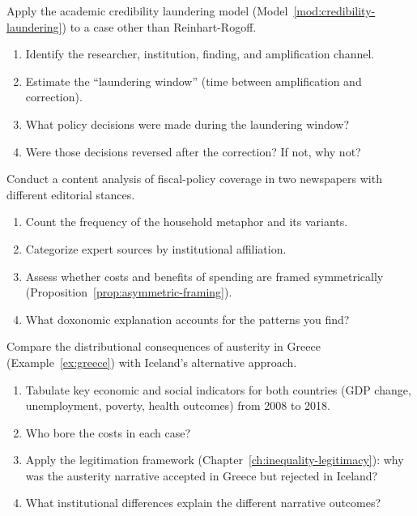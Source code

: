 \begin{exercise}
Apply the academic credibility laundering model (Model~\ref{mod:credibility-laundering}) to a case other than Reinhart-Rogoff.
\begin{enumerate}[nosep]
  \item Identify the researcher, institution, finding, and amplification channel.
  \item Estimate the ``laundering window'' (time between amplification and correction).
  \item What policy decisions were made during the laundering window?
  \item Were those decisions reversed after the correction? If not, why not?
\end{enumerate}
\end{exercise}

\begin{exercise}
Conduct a content analysis of fiscal-policy coverage in two newspapers with different editorial stances.
\begin{enumerate}[nosep]
  \item Count the frequency of the household metaphor and its variants.
  \item Categorize expert sources by institutional affiliation.
  \item Assess whether costs and benefits of spending are framed symmetrically (Proposition~\ref{prop:asymmetric-framing}).
  \item What doxonomic explanation accounts for the patterns you find?
\end{enumerate}
\end{exercise}

\begin{exercise}
Compare the distributional consequences of austerity in Greece (Example~\ref{ex:greece}) with Iceland's alternative approach.
\begin{enumerate}[nosep]
  \item Tabulate key economic and social indicators for both countries (GDP change, unemployment, poverty, health outcomes) from 2008 to 2018.
  \item Who bore the costs in each case?
  \item Apply the legitimation framework (Chapter~\ref{ch:inequality-legitimacy}): why was the austerity narrative accepted in Greece but rejected in Iceland?
  \item What institutional differences explain the different narrative outcomes?
\end{enumerate}
\end{exercise}

